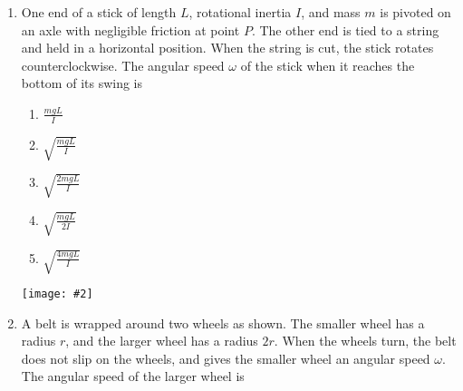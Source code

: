 \documentclass[12pt]{article}
\newcommand{\pic}[2]{\texttt{[image: \#2]}}
\begin{document}
\begin{enumerate}[leftmargin=50pt,label=\underline{\hspace{0.4in}} \arabic*]
  \begin{minipage}{0.6\textwidth}
    \begin{enumerate}[topsep=5pt]
    \item Linear momentum is not conserved, but angular momentum is conserved.
    \item Angular momentum is not conserved, but linear momentum is conserved.
    \item Kinetic energy is conserved, but angular momentum is not conserved.
    \item Kinetic energy is conserved, but linear momentum is not conserved.
    \item Both linear momentum and angular momentum are conserved, but kinetic
      energy is not conserved.
    \end{enumerate}
  \end{minipage}
  \begin{minipage}{0.3\textwidth}
    \pic{1}{collision1.png}
  \end{minipage}
  
\item One end of a stick of length $L$, rotational inertia $I$, and mass $m$ is
  pivoted on an axle with negligible friction at point $P$. The other end is
  tied to a string and held in a horizontal position. When the string is cut,
  the stick rotates counterclockwise. The angular speed $\omega$ of the stick
  when it reaches the bottom of its swing is\\
  \begin{minipage}{0.3\textwidth}
    \begin{enumerate}[noitemsep,topsep=0pt]
    \item$\displaystyle\frac{mgL}{I}$
    \item$\displaystyle\sqrt{\frac{mgL}{I}}$
    \item$\displaystyle\sqrt{\frac{2mgL}{I}}$
    \item$\displaystyle\sqrt{\frac{mgL}{2I}}$
    \item$\displaystyle\sqrt{\frac{4mgL}{I}}$
    \end{enumerate}
  \end{minipage}
  \begin{minipage}{0.65\textwidth}
    \pic{.7}{end-of-stick.png}
  \end{minipage}

\item A belt is wrapped around two wheels as shown. The smaller wheel has
  a radius $r$, and the larger wheel has a radius $2r$. When the wheels turn,
  the belt does not slip on the wheels, and gives the smaller wheel an
  angular speed $\omega$. The angular speed of the larger wheel is
  

\end{enumerate}
\end{document}
